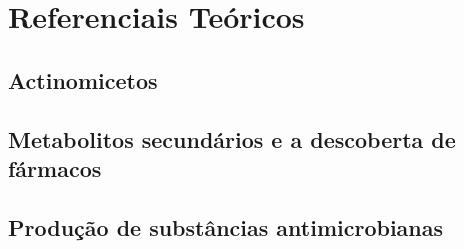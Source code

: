 \chapter{Referenciais Teóricos}
\label{cap:referenciais_teoricos}




\section{Actinomicetos}
\section{Metabolitos secundários e a descoberta de fármacos}
\section{Produção de substâncias antimicrobianas}
